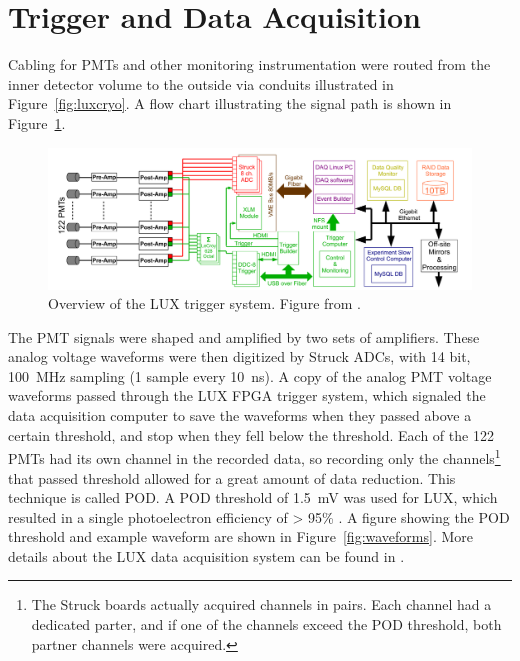 \section{Trigger and Data Acquisition}
Cabling for \ac{PMT}s and other monitoring instrumentation were routed from the inner detector volume to the outside via conduits illustrated in Figure~\ref{fig:luxcryo}. A flow chart illustrating the signal path is shown in Figure~\ref{fig:luxdaq}. 

\begin{figure}[htbp]
\begin{center}
\includegraphics[width=\textwidth]{figures/lux/lux_daq.png}
\caption{Overview of the \acs{LUX} trigger system. Figure from \cite{LUXTrigger}. }
\label{fig:luxdaq}
\end{center}
\end{figure}


The \ac{PMT} signals were shaped and amplified by two sets of amplifiers. These analog voltage waveforms were then digitized by Struck \ac{ADC}s, with 14 bit, 100~MHz sampling (1 sample every 10~ns). A copy of the analog \ac{PMT} voltage waveforms passed through the \ac{LUX} \ac{FPGA} trigger system, which signaled the data acquisition computer to save the waveforms when they passed above a certain threshold, and stop when they fell below the threshold. Each of the 122 \ac{PMT}s had its own channel in the recorded data, so recording only the channels\footnote{The Struck boards actually acquired channels in pairs. Each channel had a dedicated parter, and if one of the channels exceed the \acs{POD} threshold, both partner channels were acquired.} that passed threshold allowed for a great amount of data reduction. This technique is called \ac{POD}. A \ac{POD} threshold of 1.5~mV was used for \ac{LUX}, which resulted in a single photoelectron efficiency of > 95\% \cite{LUX:Run03Comprehensive}. A figure showing the \ac{POD} threshold and example waveform are shown in Figure~\ref{fig:waveforms}. More details about the \ac{LUX} data acquisition system can be found in \cite{LUXDAQ}. 


